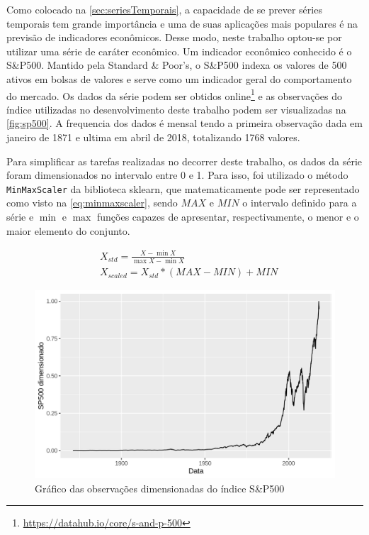 \documentclass[
    12pt,
    oneside,
    a4paper,
    english,
    brazil
]{abntex2}
\begin{document}
Como  colocado  na \autoref{sec:seriesTemporais},  a  capacidade  de se  prever
séries  temporais  tem  grande  importância  e  uma  de  suas  aplicações  mais
populares é na  previsão de indicadores econômicos. Desse  modo, neste trabalho
optou-se por  utilizar uma série  de caráter econômico. Um  indicador econômico
conhecido é  o S\&P500. Mantido  pela Standard \&  Poor's, o S\&P500  indexa os
valores  de  500  ativos  em  bolsas  de valores  e  serve  como  um  indicador
geral  do  comportamento do  mercado.  Os  dados  da  série podem  ser  obtidos
online\footnote{\url{https://datahub.io/core/s-and-p-500}} e  as observações do
índice  utilizadas no  desenvolvimento  deste trabalho  podem ser  visualizadas
na  \autoref{fig:sp500}. A  frequencia  dos  dados é  mensal  tendo a  primeira
observação dada em janeiro de 1871 e  ultima em abril de 2018, totalizando 1768
valores.

Para simplificar as tarefas realizadas no  decorrer deste trabalho, os dados da
série foram dimensionados no intervalo entre 0  e 1. Para isso, foi utilizado o
método \texttt{MinMaxScaler}  da biblioteca  sklearn, que  matematicamente pode
ser representado como visto na \autoref{eq:minmaxscaler}, sendo $MAX$ e $MIN$ o
intervalo  definido  para  a  série  e  $\min$  e  $\max$  funções  capazes  de
apresentar, respectivamente, o menor e o maior elemento do conjunto.

\begin{equation}
    \begin{split}\label{eq:minmaxscaler}
        &X_{std} = \frac{X - \min X}{\max X-\min X}\\
        &X_{scaled} = X_{std} * (MAX-MIN)+MIN
    \end{split}
\end{equation}

\begin{figure}[ht]
    \centering
    \caption{Gráfico das observações dimensionadas do índice S\&P500}\label{fig:sp500}
    \includegraphics[width=.5\linewidth]{images/SP500.png}
\end{figure}
\end{document}
